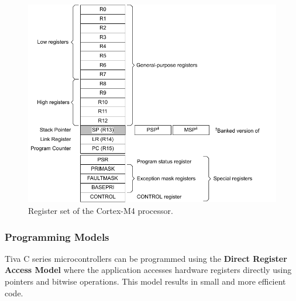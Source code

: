 \documentclass{article}
\begin{document}
\begin{figure}[H]
    \centering
    \includegraphics[width = \linewidth]{figures/cortex_m4_register_set.pdf}
    \caption{Register set of the Cortex-M4 processor.}
\end{figure}
\subsubsection{Programming Models}
Tiva C series microcontrollers can be programmed using the
\textbf{Direct Register Access Model} where the application accesses
hardware registers directly using pointers and bitwise operations. This
model results in small and more efficient code.
\end{document}
